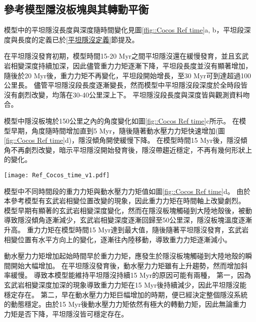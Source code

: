 \newpage
\subsection{參考模型隱沒板塊與其轉動平衡}
模型中的平坦隱沒長度與深度隨時間變化見圖\ref{ffig::Cocos Ref time}a, b，平坦段深度與長度的定義已於\ref{平坦隱沒定義}節提及。

在平坦隱沒發育初期，模型時間15-20 Myr之間平坦隱沒還在緩慢發育，並且玄武岩相變深度持續加深，因此儘管重力力矩逐漸下降，平坦段長度並沒有顯著增加，隨後於20 Myr後，重力力矩不再變化，平坦段開始增長，至30 Myr可到達超過100公里長。
儘管平坦隱沒段長度逐漸變長，然而模型中平坦隱沒段深度於全時段皆沒有劇烈改變，均落在30-40公里深上下。
平坦隱沒段長度與深度皆與觀測資料吻合。

模型中隱沒板塊於150公里之內的角度變化如圖\ref{fig::Cocos Ref time}c所示。
在模型早期，角度隨時間增加直到5 Myr，隨後隨著動水壓力力矩快速增加(圖\ref{fig::Cocos Ref time}d)，隱沒傾角開使緩慢下降。
在模型時間15 Myr後，隱沒傾角不再劇烈改變，暗示平坦隱沒開始發育後，隱沒帶趨近穩定，不再有幾何形狀上的變化。

\begin{figure*}[hb]
    \centering
    \texttt{[image: Ref\_Cocos\_time\_v1.pdf]}
    \caption[墨西哥參考模型隱沒板塊狀態隨時間變化]{墨西哥參考模型隱沒板塊狀態隨時間變化。}
    \label{fig::Cocos Ref time}
\end{figure*}

模型中不同時間段的重力力矩與動水壓力力矩值如圖\ref{fig::Cocos Ref time}d。
由於本參考模型有玄武岩相變位置改變的現象，因此重力力矩在時間軸上改變劇烈。
模型早期有顯著的玄武岩相變深度變化，然而在隱沒板塊觸碰到大陸地殼後，被動導致隱沒傾角逐漸減少，玄武岩相變深度逐漸回歸至50公里深，隱沒板塊溫度逐漸升高。
重力力矩在模型時間15 Myr達到最大值，隨後隨著平坦隱沒發育，玄武岩相變位置有水平方向上的變化，逐漸往內陸移動，導致重力力矩逐漸減小。

動水壓力力矩增加起始時間早於重力力矩，應發生於隱沒板塊觸碰到大陸地殼的瞬間開始大幅增加。
在平坦隱沒發育後，動水壓力力矩雖有上升趨勢，然而增加斜率緩慢。
導致本模型能維持平坦隱沒持續15 Myr的原因可能有兩種，
第一，因為玄武岩相變深度加深的現象導致重力力矩在15 Myr後持續減少，因此平坦隱沒能穩定存在。
第二，早在動水壓力力矩巨幅增加的時期，便已經決定整個隱沒系統的動態穩定。由於15 Myr後動水壓力力矩依然有極大的轉動力矩，因此無論重力力矩是否下降，平坦隱沒皆可穩定存在。